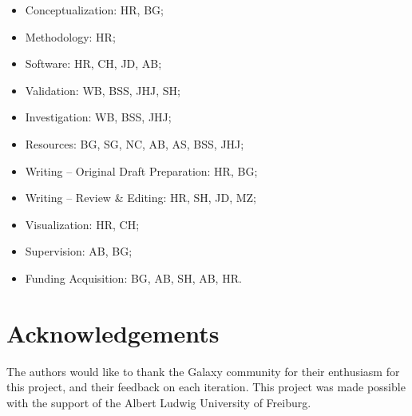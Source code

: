 \documentclass[a4paper,num-refs]{oup-contemporary}
\begin{document}
\begin{itemize}
    \item Conceptualization: HR, BG;
    \item Methodology: HR;
    \item Software: HR, CH, JD, AB;
    \item Validation: WB, BSS, JHJ, SH;
    \item Investigation: WB, BSS, JHJ;
    \item Resources: BG, SG, NC, AB, AS, BSS, JHJ;
    \item Writing – Original Draft Preparation: HR, BG;
    \item Writing – Review \& Editing: HR, SH, JD, MZ;
    \item Visualization: HR, CH;
    \item Supervision: AB, BG;
    \item Funding Acquisition: BG, AB, SH, AB, HR.
\end{itemize}

\section{Acknowledgements}
The authors would like to thank the Galaxy community for their enthusiasm for this project, and their feedback on each iteration.
This project was made possible with the support of the Albert Ludwig University of Freiburg.


\end{document}
